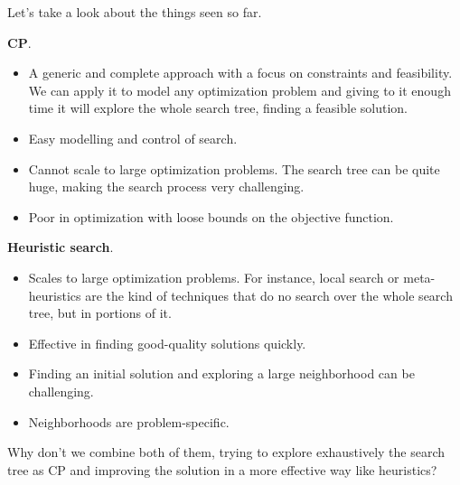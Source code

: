 Let's take a look about the things seen so far.

\hspace{3.5pt} \textbf{CP}.
\begin{itemize}
    \renewcommand{\labelitemi}{+}
    \item A generic and complete approach with a focus on constraints and feasibility. We can apply it to model any optimization problem and giving to it enough time it will explore the whole search tree, finding a feasible solution.
    \item Easy modelling and control of search.
\end{itemize} \vspace{3.5pt}
\begin{itemize}
    \renewcommand{\labelitemi}{-}
    \item Cannot scale to large optimization problems. The search tree can be quite huge, making the search process very challenging.
    \item Poor in optimization with loose bounds on the objective function.
\end{itemize} 

\hspace{3.5pt} \textbf{Heuristic search}.
\begin{itemize}
    \renewcommand{\labelitemi}{+}
    \item Scales to large optimization problems. For instance, local search or meta-heuristics are the kind of techniques that do no search over the whole search tree, but in portions of it.
    \item Effective in finding good-quality solutions quickly.
\end{itemize} \vspace{3.5pt}
\begin{itemize}
    \renewcommand{\labelitemi}{-}
    \item Finding an initial solution and exploring a large neighborhood can be challenging.
    \item Neighborhoods are problem-specific.
\end{itemize} 
Why don't we combine both of them, trying to explore exhaustively the search tree as CP and improving the solution in a more effective way like heuristics?